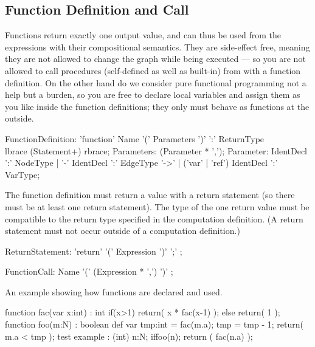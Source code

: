 \subsection{Function Definition and Call}\label{sub:functions}\label{sec:funccall} 

Functions return exactly one output value, and can thus be used from the expressions with their compositional semantics.
They are side-effect free, meaning they are not allowed to change the graph while being executed ---
so you are not allowed to call procedures (self-defined as well as built-in) from with a function definition.
On the other hand do we consider pure functional programming not a help but a burden, so you are free to declare local variables and assign them as you like inside the function definitions; they only must behave as functions at the outside.

\begin{rail} 
  FunctionDefinition: 
	'function' Name '(' Parameters ')' ':' ReturnType \\
	lbrace (Statement+) rbrace;
  Parameters: (Parameter * ',');
  Parameter: IdentDecl ':' NodeType |
  '-' IdentDecl ':' EdgeType '->' |
  ('var' | 'ref') IdentDecl ':' VarType;
\end{rail}

The function definition must return a value with a return statement (so there must be at least one return statement).
The type of the one return value must be compatible to the return type specified in the computation definition.
(A return statement must not occur outside of a computation definition.)

\begin{rail}
  ReturnStatement: 'return' '(' Expression ')' ';' ;
\end{rail}

\begin{rail}
  FunctionCall: Name '(' (Expression * ',') ')' ;
\end{rail}

\begin{example}
An example showing how functions are declared and used.
  \begin{grgen}
function fac(var x:int) : int
{
	if(x>1) {
		return( x * fac(x-1) );
	} else {
		return( 1 );
	}
}
function foo(m:N) : boolean
{
	def var tmp:int = fac(m.a);
	tmp = tmp - 1;
	return( m.a < tmp );
}
test example : (int)
{
	n:N;
	if{foo(n);}
	return ( fac(n.a) );
}
  \end{grgen}
\end{example}


